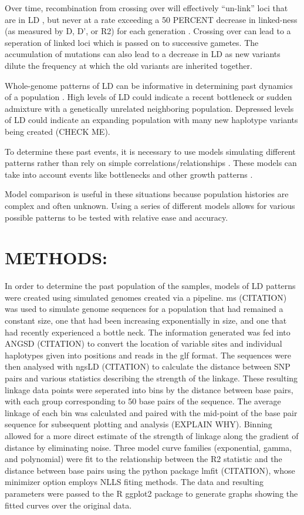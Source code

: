 \documentclass[11pt]{article}
\begin{document}
\begin{linenumbers}
Over time, recombination from crossing over will effectively “un-link” loci that are in LD \citep{slatkin2008linkage}, but never at a rate exceeding a 50 PERCENT decrease in linked-ness (as measured by D, D’, or R2) for each generation \citep{weinberg1909vererbungsgesetze}. Crossing over can lead to a seperation of linked loci which is passed on to successive gametes. The accumulation of mutations can also lead to a decrease in LD as new variants dilute the frequency at which the old variants are inherited together.

Whole-genome patterns of LD can be informative in determining past dynamics of a population \citep{hill1981estimation, park2012linkage}. High levels of LD could indicate a recent bottleneck or sudden admixture with a genetically unrelated neighboring population. Depressed levels of LD could indicate an expanding population with many new haplotype variants being created (CHECK ME).

To determine these past events, it is necessary to use models simulating different patterns rather than rely on simple correlations/relationships \citep{park2012linkage}. These models can take into account events like bottlenecks and other growth patterns \citep{park2012linkage}. 

Model comparison is useful in these situations because population histories are complex and often unknown. Using a series of different models allows for various possible patterns to be tested with relative ease and accuracy. 

\section{METHODS:}
In order to determine the past population of the samples, models of LD patterns were created using simulated genomes created via a pipeline. ms (CITATION) was used to simulate genome sequences for a population  that had remained a constant size, one that had been increasing exponentially in size, and one that had recently experienced a bottle neck. The information generated was fed into ANGSD (CITATION) to convert the  location of variable sites and individual haplotypes given into positions and reads in the glf format. The sequences were then analysed with ngsLD (CITATION) to calculate the distance between SNP pairs and various statistics describing the strength of the linkage. These resulting linkage data points were seperated into bins by the distance between base pairs, with each group corresponding to 50 base pairs of the sequence. The average linkage of each bin was calculated and paired with the mid-point of the base pair sequence for subsequent plotting and analysis (EXPLAIN WHY). Binning allowed for a more direct estimate of the strength of linkage along the gradient of distance by eliminating noise.  Three model curve families (exponential, gamma, and polynomial) were fit to the relationship between the R2 statistic and the distance between base pairs using the python package lmfit (CITATION), whose minimizer option employs NLLS fiting methods. The data and resulting parameters were passed to the R ggplot2 package to generate graphs showing the fitted curves over the original data. 


\end{linenumbers}
\end{document}

